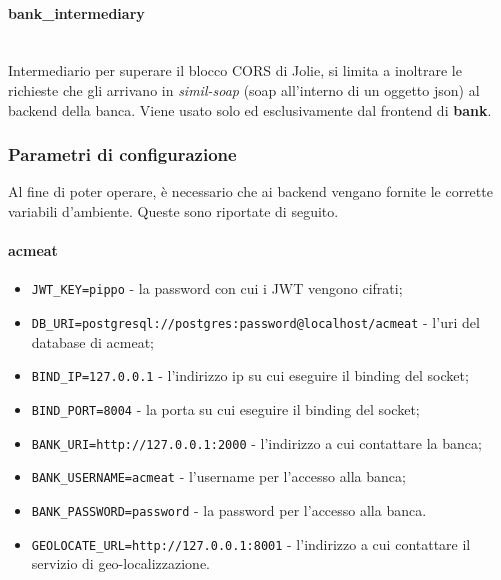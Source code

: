 \documentclass[11pt]{article} %
\begin{document}
\paragraph{bank\_intermediary}\mbox{}\\
Intermediario per superare il blocco CORS di Jolie, si limita a inoltrare le richieste che gli arrivano in \emph{simil-soap} (soap all'interno di un oggetto json) al backend della banca. Viene usato solo ed esclusivamente dal frontend di \textbf{bank}.

\subsubsection{Parametri di configurazione}

Al fine di poter operare, è necessario che ai backend vengano fornite le corrette variabili d'ambiente. Queste sono riportate di seguito.
\paragraph{acmeat}
\begin{itemize}
\item \verb|JWT_KEY=pippo| - la password con cui i JWT vengono cifrati;
\item \verb|DB_URI=postgresql://postgres:password@localhost/acmeat| - l'uri del database di acmeat;
\item \verb|BIND_IP=127.0.0.1| - l'indirizzo ip su cui eseguire il binding del socket;
\item \verb|BIND_PORT=8004| - la porta su cui eseguire il binding del socket;
\item \verb|BANK_URI=http://127.0.0.1:2000| - l'indirizzo a cui contattare la banca;
\item \verb|BANK_USERNAME=acmeat| - l'username per l'accesso alla banca;
\item \verb|BANK_PASSWORD=password| - la password per l'accesso alla banca.
\item \verb |GEOLOCATE_URL=http://127.0.0.1:8001| - l'indirizzo a cui contattare il servizio di geo-localizzazione.
\end{itemize}
\end{document}
